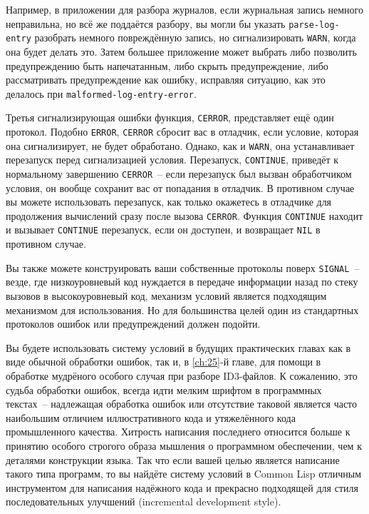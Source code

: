Например, в приложении для разбора журналов, если журнальная запись немного неправильна, но
всё же поддаётся разбору, вы могли бы указать \lstinline{parse-log-entry} разобрать немного
повреждённую запись, но сигнализировать \lstinline{WARN}, когда она будет делать это. Затем
большее приложение может выбрать либо позволить предупреждению быть напечатанным, либо
скрыть предупреждение, либо рассматривать предупреждение как ошибку, исправляя ситуацию,
как это делалось при \lstinline{malformed-log-entry-error}.

Третья сигнализирующая ошибки функция, \lstinline{CERROR}, представляет ещё один протокол.
Подобно \lstinline{ERROR}, \lstinline{CERROR} сбросит вас в отладчик, если условие, которая она
сигнализирует, не будет обработано. Однако, как и \lstinline{WARN}, она устанавливает перезапуск
перед сигнализацией условия. Перезапуск, \lstinline{CONTINUE}, приведёт к нормальному
завершению \lstinline{CERROR}~-- если перезапуск был вызван обработчиком условия, он вообще
сохранит вас от попадания в отладчик. В противном случае вы можете использовать
перезапуск, как только окажетесь в отладчике для продолжения вычислений сразу после вызова
\lstinline{CERROR}. Функция \lstinline{CONTINUE} находит и вызывает \lstinline{CONTINUE} перезапуск, если
он доступен, и возвращает \lstinline{NIL} в противном случае.

Вы также можете конструировать ваши собственные протоколы поверх \lstinline{SIGNAL}~-- везде,
где низкоуровневый код нуждается в передаче информации назад по стеку вызовов в
высокоуровневый код, механизм условий является подходящим механизмом для использования. Но
для большинства целей один из стандартных протоколов ошибок или предупреждений должен
подойти.

Вы будете использовать систему условий в будущих практических главах как в виде обычной
обработки ошибок, так и, в \ref{ch:25}-й главе, для помощи в обработке мудрёного особого случая при
разборе ID3-файлов.  К сожалению, это судьба обработки ошибок, всегда идти мелким шрифтом
в программных текстах~-- надлежащая обработка ошибок или отсутствие таковой является
часто наибольшим отличием иллюстративного кода и утяжелённого кода промышленного качества.
Хитрость написания последнего относится больше к принятию особого строгого образа мышления
о программном обеспечении, чем к деталями конструкции языка. Так что если вашей целью
является написание такого типа программ, то вы найдёте систему условий в Common Lisp
отличным инструментом для написания надёжного кода и прекрасно подходящей для стиля
последовательных улучшений (incremental development style).

